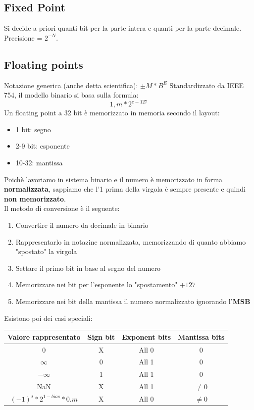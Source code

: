 \documentclass{report}
\begin{document}
    \subsection{Fixed Point}
        Si decide a priori quanti bit per la parte intera e quanti per la parte decimale. \\
        Precisione = $2^{-N}$.
    \subsection{Floating points}     
        Notazione generica (anche detta scientifica): $\pm M * B^E$     
        Standardizzato da IEEE 754, il modello binario si basa sulla formula:
        $$1,m * 2^{e-127}$$
        Un floating point a 32 bit è memorizzato in memoria secondo il layout:
        \begin{itemize}
            \item 1 bit: segno
            \item 2-9 bit: esponente
            \item 10-32: mantissa
        \end{itemize}
        Poichè lavoriamo in sistema binario e il numero è memorizzato
        in forma \textbf{normalizzata}, sappiamo che
        l'1 prima della virgola è sempre presente e quindi \textbf{non memorizzato}. \\
        Il metodo di conversione è il seguente:
        \begin{enumerate}
            \item Convertire il numero da decimale in binario
            \item Rappresentarlo in notazine normalizzata, memorizzando di quanto
                abbiamo "spostato" la virgola
            \item Settare il primo bit in base al segno del numero
            \item Memorizzare nei bit per l'esponente lo "spostamento" $+ 127$
            \item Memorizzare nei bit della mantissa
                il numero normalizzato ignorando l'\textbf{MSB}
        \end{enumerate}
        Esistono poi dei casi speciali:
        \begin{center}
            \begin{tabular}{|c|c|c|c|}
                \hline
                Valore rappresentato & Sign bit & Exponent bits & Mantissa bits  \\
                \hline
                0 & X & All 0 & 0 \\
                \hline
                $\infty$ & 0 & All 1 & 0 \\
                \hline
                $- \infty$ & 1 & All 1 & 0 \\
                \hline
                NaN & X & All 1 & $\neq 0$ \\
                \hline
                $(-1)^s * 2^{1-bias} * 0.m$ & X & All 0 & $\neq 0$ \\
                \hline
            \end{tabular}
        \end{center}
\end{document}
